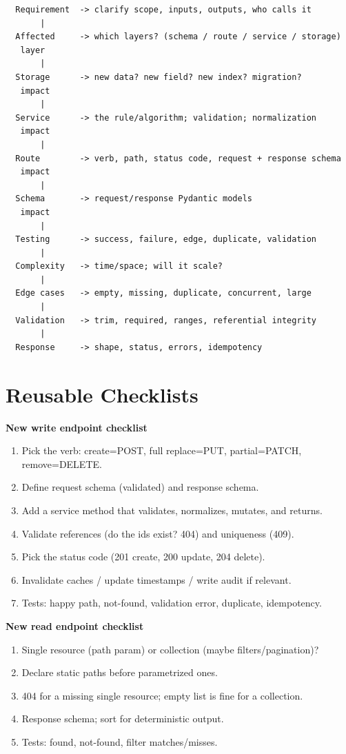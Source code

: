 \documentclass[11pt,a4paper]{report}
\begin{document}
\begin{verbatim}
  Requirement  -> clarify scope, inputs, outputs, who calls it
       |
  Affected     -> which layers? (schema / route / service / storage)
   layer
       |
  Storage      -> new data? new field? new index? migration?
   impact
       |
  Service      -> the rule/algorithm; validation; normalization
   impact
       |
  Route        -> verb, path, status code, request + response schema
   impact
       |
  Schema       -> request/response Pydantic models
   impact
       |
  Testing      -> success, failure, edge, duplicate, validation
       |
  Complexity   -> time/space; will it scale?
       |
  Edge cases   -> empty, missing, duplicate, concurrent, large
       |
  Validation   -> trim, required, ranges, referential integrity
       |
  Response     -> shape, status, errors, idempotency
\end{verbatim}

\section{Reusable Checklists}

\textbf{New write endpoint checklist}
\begin{enumerate}[leftmargin=1.5em]
  \item Pick the verb: create=POST, full replace=PUT, partial=PATCH,
        remove=DELETE.
  \item Define request schema (validated) and response schema.
  \item Add a service method that validates, normalizes, mutates, and returns.
  \item Validate references (do the ids exist? 404) and uniqueness (409).
  \item Pick the status code (201 create, 200 update, 204 delete).
  \item Invalidate caches / update timestamps / write audit if relevant.
  \item Tests: happy path, not-found, validation error, duplicate, idempotency.
\end{enumerate}

\textbf{New read endpoint checklist}
\begin{enumerate}[leftmargin=1.5em]
  \item Single resource (path param) or collection (maybe filters/pagination)?
  \item Declare static paths before parametrized ones.
  \item 404 for a missing single resource; empty list is fine for a collection.
  \item Response schema; sort for deterministic output.
  \item Tests: found, not-found, filter matches/misses.
\end{enumerate}
\end{document}
